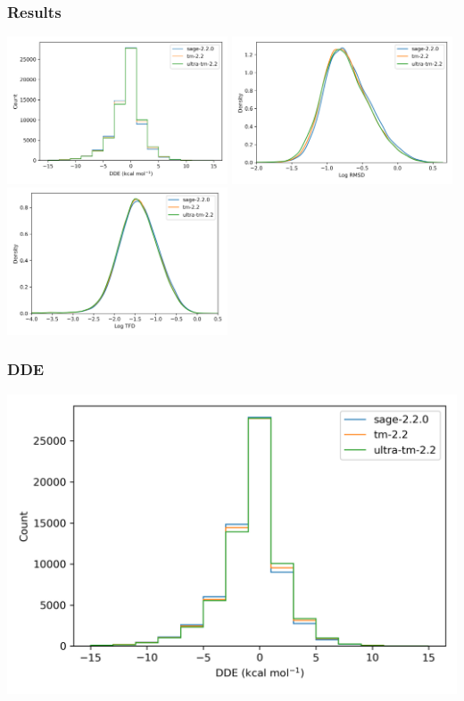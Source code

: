 \documentclass{beamer}
\begin{document}
\begin{frame}
  \frametitle{Results}
  \includegraphics[width=0.49\textwidth]{figs/dde.png}
  \includegraphics[width=0.49\textwidth]{figs/rmsd.png}
  \includegraphics[width=0.49\textwidth]{figs/tfd.png}
\end{frame}

\begin{frame}
  \frametitle{DDE}
  \begin{center}
    \includegraphics[height=0.8\textheight]{figs/dde}
  \end{center}
\end{frame}
\end{document}
